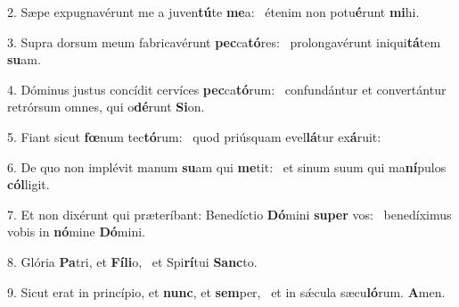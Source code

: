 2. Sæpe expugnavérunt me a juven\textbf{tú}te \textbf{me}a: \ast\  étenim non potu\textbf{é}runt \textbf{mi}hi.\

3. Supra dorsum meum fabricavérunt \textbf{pec}ca\textbf{tó}res: \ast\  prolongavérunt iniqui\textbf{tá}tem \textbf{su}am.\

4. Dóminus justus concídit cervíces \textbf{pec}ca\textbf{tó}rum: \ast\  confundántur et convertántur retrórsum omnes, qui o\textbf{dé}runt \textbf{Si}on.\

5. Fiant sicut \textbf{fœ}num tec\textbf{tó}rum: \ast\  quod priúsquam evel\textbf{lá}tur ex\textbf{á}ruit:\

6. De quo non implévit manum \textbf{su}am qui \textbf{me}tit: \ast\  et sinum suum qui ma\textbf{ní}pulos \textbf{cól}ligit.\

7. Et non dixérunt qui præteríbant: Benedíctio \textbf{Dó}mini \textbf{su}\textbf{per} vos: \ast\  benedíximus vobis in \textbf{nó}mine \textbf{Dó}mini.\

8. Glória \textbf{Pa}tri, et \textbf{Fí}\textbf{li}o, \ast\  et Spi\textbf{rí}tui \textbf{Sanc}to.\

9. Sicut erat in princípio, et \textbf{nunc}, et \textbf{sem}per, \ast\  et in sǽcula sæcu\textbf{ló}rum. \textbf{A}men.\

